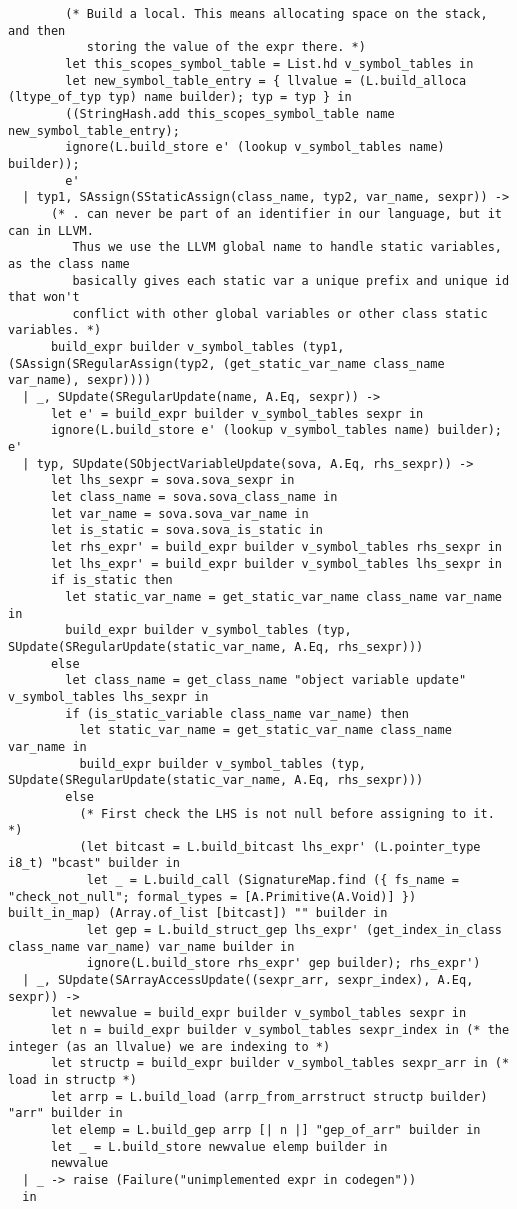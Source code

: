 \documentclass{article}
\begin{document}
\begin{verbatim}
        (* Build a local. This means allocating space on the stack, and then
           storing the value of the expr there. *)
        let this_scopes_symbol_table = List.hd v_symbol_tables in
        let new_symbol_table_entry = { llvalue = (L.build_alloca (ltype_of_typ typ) name builder); typ = typ } in
        ((StringHash.add this_scopes_symbol_table name new_symbol_table_entry);
        ignore(L.build_store e' (lookup v_symbol_tables name) builder));
        e'
  | typ1, SAssign(SStaticAssign(class_name, typ2, var_name, sexpr)) ->
      (* . can never be part of an identifier in our language, but it can in LLVM.
         Thus we use the LLVM global name to handle static variables, as the class name
         basically gives each static var a unique prefix and unique id that won't
         conflict with other global variables or other class static variables. *)
      build_expr builder v_symbol_tables (typ1, (SAssign(SRegularAssign(typ2, (get_static_var_name class_name var_name), sexpr))))
  | _, SUpdate(SRegularUpdate(name, A.Eq, sexpr)) ->
      let e' = build_expr builder v_symbol_tables sexpr in
      ignore(L.build_store e' (lookup v_symbol_tables name) builder); e'
  | typ, SUpdate(SObjectVariableUpdate(sova, A.Eq, rhs_sexpr)) ->
      let lhs_sexpr = sova.sova_sexpr in
      let class_name = sova.sova_class_name in
      let var_name = sova.sova_var_name in
      let is_static = sova.sova_is_static in
      let rhs_expr' = build_expr builder v_symbol_tables rhs_sexpr in
      let lhs_expr' = build_expr builder v_symbol_tables lhs_sexpr in
      if is_static then
        let static_var_name = get_static_var_name class_name var_name in
        build_expr builder v_symbol_tables (typ, SUpdate(SRegularUpdate(static_var_name, A.Eq, rhs_sexpr)))
      else
        let class_name = get_class_name "object variable update" v_symbol_tables lhs_sexpr in
        if (is_static_variable class_name var_name) then
          let static_var_name = get_static_var_name class_name var_name in
          build_expr builder v_symbol_tables (typ, SUpdate(SRegularUpdate(static_var_name, A.Eq, rhs_sexpr)))
        else
          (* First check the LHS is not null before assigning to it. *)
          (let bitcast = L.build_bitcast lhs_expr' (L.pointer_type i8_t) "bcast" builder in
           let _ = L.build_call (SignatureMap.find ({ fs_name = "check_not_null"; formal_types = [A.Primitive(A.Void)] }) built_in_map) (Array.of_list [bitcast]) "" builder in
           let gep = L.build_struct_gep lhs_expr' (get_index_in_class class_name var_name) var_name builder in
           ignore(L.build_store rhs_expr' gep builder); rhs_expr')
  | _, SUpdate(SArrayAccessUpdate((sexpr_arr, sexpr_index), A.Eq, sexpr)) ->
      let newvalue = build_expr builder v_symbol_tables sexpr in
      let n = build_expr builder v_symbol_tables sexpr_index in (* the integer (as an llvalue) we are indexing to *)
      let structp = build_expr builder v_symbol_tables sexpr_arr in (* load in structp *)
      let arrp = L.build_load (arrp_from_arrstruct structp builder) "arr" builder in
      let elemp = L.build_gep arrp [| n |] "gep_of_arr" builder in
      let _ = L.build_store newvalue elemp builder in
      newvalue
  | _ -> raise (Failure("unimplemented expr in codegen"))
  in


\end{verbatim}
\end{document}
